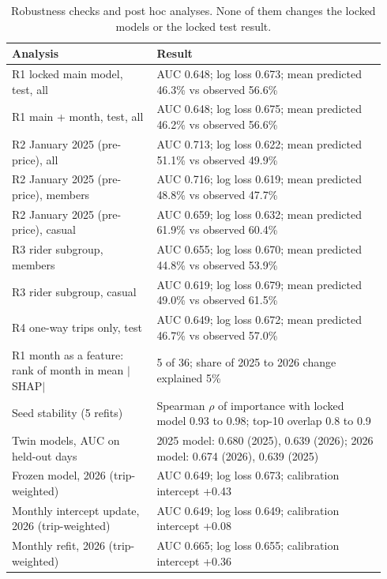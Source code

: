 \begin{table}[!htbp]
\centering
\scriptsize
\caption{Robustness checks and post hoc analyses. None of them changes the locked models or the locked test result.}
\label{tab:robust}
\begin{tabular}{p{0.36\linewidth}p{0.58\linewidth}}
\toprule
Analysis & Result \\
\midrule
R1 locked main model, test, all & AUC 0.648; log loss 0.673; mean predicted 46.3\% vs observed 56.6\% \\
R1 main + month, test, all & AUC 0.648; log loss 0.675; mean predicted 46.2\% vs observed 56.6\% \\
R2 January 2025 (pre-price), all & AUC 0.713; log loss 0.622; mean predicted 51.1\% vs observed 49.9\% \\
R2 January 2025 (pre-price), members & AUC 0.716; log loss 0.619; mean predicted 48.8\% vs observed 47.7\% \\
R2 January 2025 (pre-price), casual & AUC 0.659; log loss 0.632; mean predicted 61.9\% vs observed 60.4\% \\
R3 rider subgroup, members & AUC 0.655; log loss 0.670; mean predicted 44.8\% vs observed 53.9\% \\
R3 rider subgroup, casual & AUC 0.619; log loss 0.679; mean predicted 49.0\% vs observed 61.5\% \\
R4 one-way trips only, test & AUC 0.649; log loss 0.672; mean predicted 46.7\% vs observed 57.0\% \\
R1 month as a feature: rank of month in mean $|$SHAP$|$ & 5 of 36; share of 2025 to 2026 change explained 5\% \\
Seed stability (5 refits) & Spearman $\rho$ of importance with locked model 0.93 to 0.98; top-10 overlap 0.8 to 0.9 \\
Twin models, AUC on held-out days & 2025 model: 0.680 (2025), 0.639 (2026); 2026 model: 0.674 (2026), 0.639 (2025) \\
Frozen model, 2026 (trip-weighted) & AUC 0.649; log loss 0.673; calibration intercept +0.43 \\
Monthly intercept update, 2026 (trip-weighted) & AUC 0.649; log loss 0.649; calibration intercept +0.08 \\
Monthly refit, 2026 (trip-weighted) & AUC 0.665; log loss 0.655; calibration intercept +0.36 \\
\bottomrule
\end{tabular}
\end{table}
